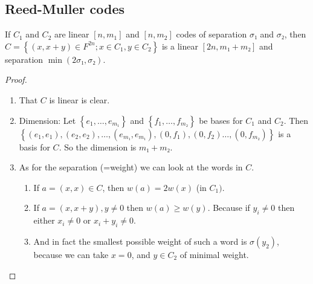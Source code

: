 \documentclass[english]{lbscript}
\begin{document}
\subsection{Reed-Muller codes}
\label{sec:reed-muller-codes}


\begin{theorem}{}{}
  If \(C_1\) and \(C_2\) are linear \(\left[ n, m_1 \right]\) and \([n, m_2]\)  codes of separation \(𝜎₁\) and \(𝜎₂\), then \(C= \left\{ (x, x+y)∈F^{2n}; x∈C_1, y∈C_2 \right\} \) is a linear \([2n, m₁+m₂]\) and separation \(\min(2𝜎₁, 𝜎₂)\).
\end{theorem}
\begin{proof}
  \begin{enumerate}
    \item\label{item:79} That \(C\) is linear is clear.
    \item\label{item:80} Dimension: Let \(\left\{ e_1, \dots, e_{m₁} \right\} \) and \(\left\{ f_1, \dots, f_{m₂} \right\} \) be bases for \(C_1\) and \(C_2\). Then \(\left\{ (e_1, e_1), (e_2,e_2), \dots, (e_{m₁}, e_{m₁}), (0, f_1), (0, f_2) \dots, (0, f_{m₂}) \right\} \) is a basis for \(C\). So the dimension is \(m₁+m₂\).

    \item\label{item:81}   As for the separation (=weight) we can look at the words in \(C\).
    \begin{enumerate}
      \item\label{item:75} If \(a=(x,x)∈C\), then \(w(a)=2w(x)\) (in \(C_1)\).
      \item\label{item:76} If \(a=(x,x+y), y≠0\) then \(w(a)≥w(y)\). Because if \(y_i≠0\) then either \(x_i≠0\) or \(x_i+y_i≠0\).
      \item\label{item:78} And in fact the smallest possible weight of such a word is \(𝜎(y_2)\), because we can take \(x=0\), and \(y∈C_2\) of minimal weight.
    \end{enumerate}
  \end{enumerate}
\end{proof}
\end{document}
